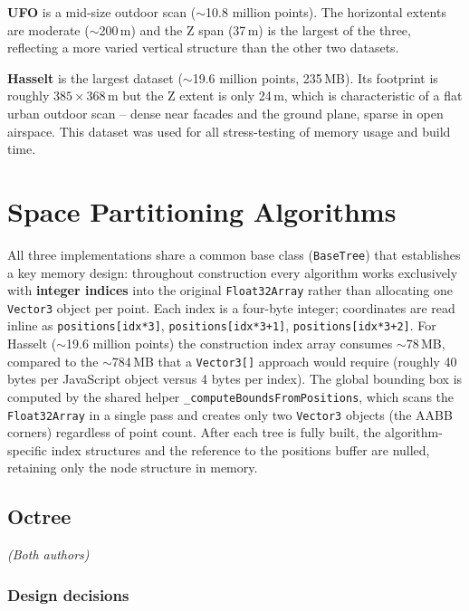 \documentclass[12pt,a4paper]{article}
\begin{document}
\textbf{UFO} is a mid-size outdoor scan ($\sim$10.8 million points). The
horizontal extents are moderate ($\sim$200\,m) and the Z span (37\,m) is the
largest of the three, reflecting a more varied vertical structure than the
other two datasets.

\textbf{Hasselt} is the largest dataset ($\sim$19.6 million points, 235\,MB).
Its footprint is roughly $385 \times 368$\,m but the Z extent is only 24\,m,
which is characteristic of a flat urban outdoor scan -- dense near facades and
the ground plane, sparse in open airspace. This dataset was used for all
stress-testing of memory usage and build time.

\section{Space Partitioning Algorithms}
\label{sec:algorithms}

All three implementations share a common base class (\texttt{BaseTree}) that
establishes a key memory design: throughout construction every algorithm works
exclusively with \textbf{integer indices} into the original
\texttt{Float32Array} rather than allocating one \texttt{Vector3} object per
point. Each index is a four-byte integer; coordinates are read inline as
\texttt{positions[idx*3]}, \texttt{positions[idx*3+1]},
\texttt{positions[idx*3+2]}. For Hasselt ($\sim$19.6 million points) the
construction index array consumes $\sim$78\,MB, compared to the $\sim$784\,MB
that a \texttt{Vector3[]} approach would require (roughly 40\,bytes per
JavaScript object versus 4 bytes per index). The global bounding box is
computed by the shared helper \texttt{\_computeBoundsFromPositions}, which
scans the \texttt{Float32Array} in a single pass and creates only two
\texttt{Vector3} objects (the AABB corners) regardless of point count. After
each tree is fully built, the algorithm-specific index structures and the
reference to the positions buffer are nulled, retaining only the node
structure in memory.

\subsection{Octree}
\textit{(Both authors)}

\subsubsection*{Design decisions}
\end{document}
